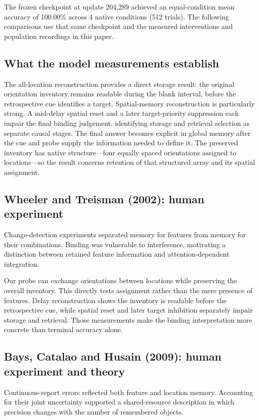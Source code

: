 \documentclass[11pt]{article}
\begin{document}
The frozen checkpoint at update 204,289 achieved an equal-condition mean accuracy of 100.00\% across 4 native conditions (512 trials). The following comparisons use that same checkpoint and the measured interventions and population recordings in this paper.

\subsection{What the model measurements establish}
The all-location reconstruction provides a direct storage result: the original orientation inventory remains readable during the blank interval, before the retrospective cue identifies a target. Spatial-memory reconstruction is particularly strong. A mid-delay spatial reset and a later target-priority suppression each impair the final binding judgement, identifying storage and retrieval selection as separate causal stages. The final answer becomes explicit in global memory after the cue and probe supply the information needed to define it. The preserved inventory has native structure—four equally spaced orientations assigned to locations—so the result concerns retention of that structured array and its spatial assignment.

\subsection{Wheeler and Treisman (2002): human experiment}
Change-detection experiments separated memory for features from memory for their combinations. Binding was vulnerable to interference, motivating a distinction between retained feature information and attention-dependent integration. \cite{bio_wheeler}

Our probe can exchange orientations between locations while preserving the overall inventory. This directly tests assignment rather than the mere presence of features. Delay reconstruction shows the inventory is readable before the retrospective cue, while spatial reset and later target inhibition separately impair storage and retrieval. Those measurements make the binding interpretation more concrete than terminal accuracy alone.

\subsection{Bays, Catalao and Husain (2009): human experiment and theory}
Continuous-report errors reflected both feature and location memory. Accounting for their joint uncertainty supported a shared-resource description in which precision changes with the number of remembered objects. \cite{bio_bays}
\end{document}
